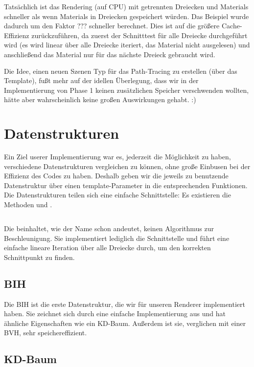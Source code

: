 Tatsächlich ist das Rendering (auf CPU) mit getrennten Dreiecken und Materials schneller als wenn Materials in Dreiecken gespeichert würden. Das  Beispiel wurde dadurch um den Faktor ??? schneller berechnet. Dies ist auf die größere Cache-Effizienz zurückzuführen, da zuerst der Schnitttest für alle Dreiecke durchgeführt wird (es wird linear über alle Dreiecke iteriert, das Material nicht ausgelesen) und anschließend das Material nur für das nächste Dreieck gebraucht wird.

Die Idee, einen neuen Szenen Typ für das Path-Tracing zu erstellen (über das  Template), fußt mehr auf der idellen Überlegung, dass wir in der Implementierung von Phase 1 keinen zusätzlichen Speicher verschwenden wollten, hätte aber wahrscheinlich keine großen Auswirkungen gehabt. :)


\section{Datenstrukturen}

Ein Ziel userer Implementierung war es, jederzeit die Möglichkeit zu haben, verschiedene Datenstrukturen vergleichen zu können, ohne große Einbusen bei der Effizienz des Codes zu haben. Deshalb geben wir die jeweils zu benutzende Datenstruktur über einen template-Parameter in die entsprechenden Funktionen. Die Datenstrukturen teilen sich eine einfache Schnittstelle: Es existieren die Methoden  und .

\subsection{}

Die  beinhaltet, wie der Name schon andeutet, keinen Algorithmus zur Beschleunigung. Sie implementiert lediglich die Schnittstelle und führt eine einfache lineare Iteration über alle Dreiecke durch, um den korrekten Schnittpunkt zu finden.

\subsection{BIH}

Die BIH ist die erste Datenstruktur, die wir für unseren Renderer implementiert haben. Sie zeichnet sich durch eine einfache Implementierung aus und hat ähnliche Eigenschaften wie ein KD-Baum. Außerdem ist sie, verglichen mit einer BVH, sehr speichereffizient.

\subsection{KD-Baum}


